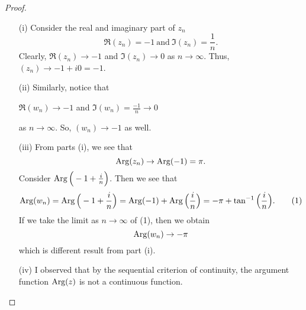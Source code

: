 \documentclass[a4paper]{article}
\begin{document}
\begin{proof}
    \begin{enumerate}
        \item[(i)] Consider the real and imaginary part of \( {z}_{n} \) 
            \[  \Re({z}_{n}) = -1 \ \text{and} \ \Im({z}_{n}) = \frac{ 1 }{ n }.  \]
            Clearly, \( \Re({z}_{n}) \to -1  \) and \( \Im({z}_{n}) \to 0  \) as \( n \to \infty  \). Thus, \( ({z}_{n}) \to -1 + i 0 = -1 \).
        \item[(ii)] Similarly, notice that 
            \begin{center}
                \( \Re({w}_{n}) \to -1 \) and \( \Im({w}_{n}) = \frac{ -1 }{ n }  \to 0   \)
            \end{center}
            as \( n \to \infty  \). So, \( ({w}_{n}) \to -1 \) as well.
        \item[(iii)] From parts (i), we see that
            \[  \operatorname{Arg}({z}_{n}) \to \operatorname{Arg}(-1) = \pi. \]
            Consider \( \operatorname{Arg}\Big(-1 + \frac{ i }{ n } \Big) \). Then we see that 
            \[   \operatorname{Arg}({w}_{n}) = \operatorname{Arg}\Big( -1 + \frac{ i }{ n } \Big) = \operatorname{Arg}(-1) + \operatorname{Arg} \Big(  \frac{ i }{ n }  \Big) = -\pi + \tan^{-1} \Big(  \frac{ i }{ n }  \Big). \tag{1} \] 
            If we take the limit as \( n \to \infty   \) of (1), then we obtain
            \[  \operatorname{Arg}({w}_{n}) \to -\pi \]
            which is different result from part (i).
        \item[(iv)] I observed that by the sequential criterion of continuity, the argument function \( \operatorname{Arg}(z)  \) is not a continuous function.
    \end{enumerate}
\end{proof}
\end{document}
